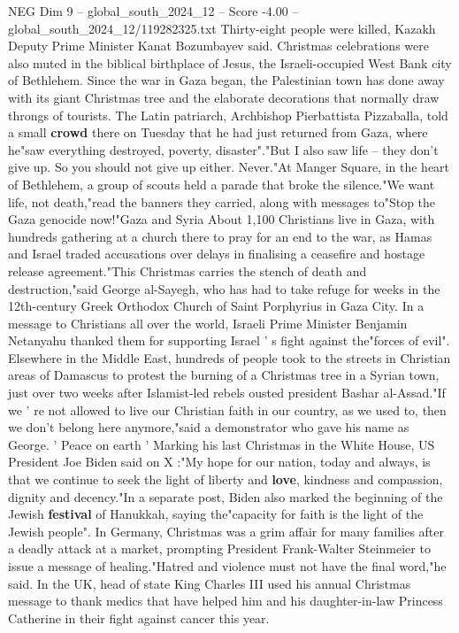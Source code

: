 \begin{textsample}{NEG Dim 9 – global\_south\_2024\_12 – Score -4.00 – global\_south\_2024\_12/119282325.txt}
Thirty-eight people were killed, Kazakh Deputy Prime Minister Kanat Bozumbayev said.
Christmas celebrations were also muted in the biblical birthplace of Jesus, the Israeli-occupied West Bank city of Bethlehem.
Since the war in Gaza began, the Palestinian town has done away with its giant Christmas tree and the elaborate decorations that normally draw throngs of tourists.
The Latin patriarch, Archbishop Pierbattista Pizzaballa, told a small \textbf{crowd} there on Tuesday that he had just returned from Gaza, where he"saw everything destroyed, poverty, disaster"."But I also saw life -- they don't give up.
So you should not give up either.
Never."At Manger Square, in the heart of Bethlehem, a group of scouts held a parade that broke the silence."We want life, not death,"read the banners they carried, along with messages to"Stop the Gaza genocide now!"Gaza and Syria About 1,100 Christians live in Gaza, with hundreds gathering at a church there to pray for an end to the war, as Hamas and Israel traded accusations over delays in finalising a ceasefire and hostage release agreement."This Christmas carries the stench of death and destruction,"said George al-Sayegh, who has had to take refuge for weeks in the 12th-century Greek Orthodox Church of Saint Porphyrius in Gaza City.
In a message to Christians all over the world, Israeli Prime Minister Benjamin Netanyahu thanked them for supporting Israel ' s fight against the"forces of evil".
Elsewhere in the Middle East, hundreds of people took to the streets in Christian areas of Damascus to protest the burning of a Christmas tree in a Syrian town, just over two weeks after Islamist-led rebels ousted president Bashar al-Assad."If we ' re not allowed to live our Christian faith in our country, as we used to, then we don't belong here anymore,"said a demonstrator who gave his name as George. ' Peace on earth ' Marking his last Christmas in the White House, US President Joe Biden said on X :"My hope for our nation, today and always, is that we continue to seek the light of liberty and \textbf{love}, kindness and compassion, dignity and decency."In a separate post, Biden also marked the beginning of the Jewish \textbf{festival} of Hanukkah, saying the"capacity for faith is the light of the Jewish people".
In Germany, Christmas was a grim affair for many families after a deadly attack at a market, prompting President Frank-Walter Steinmeier to issue a message of healing."Hatred and violence must not have the final word,"he said.
In the UK, head of state King Charles III used his annual Christmas message to thank medics that have helped him and his daughter-in-law Princess Catherine in their fight against cancer this year.

\end{textsample}
